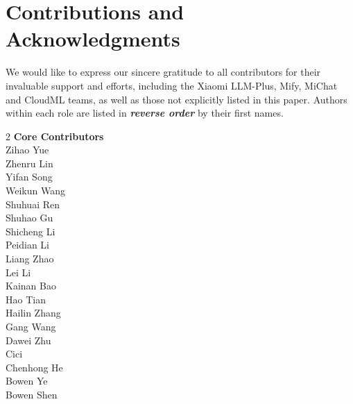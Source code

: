 
\section{Contributions and Acknowledgments}
We would like to express our sincere gratitude to all contributors for their invaluable support and efforts, including the Xiaomi LLM-Plus, Mify, MiChat and CloudML teams, as well as those not explicitly listed in this paper.
Authors within each role are listed in \textit{\textbf{reverse order}} by their first names. 


\begin{multicols}{2} %
\noindent
\textbf{\color{ourred} Core Contributors} \\
\color{ourred} Zihao Yue \\
\color{ourred} Zhenru Lin \\
\color{ourred} Yifan Song \\
\color{ourred} Weikun Wang \\
\color{ourred} Shuhuai Ren \\
\color{ourred} Shuhao Gu \\
\color{ourred} Shicheng Li \\
\color{ourred} Peidian Li \\
\color{ourred} Liang Zhao \\
\color{ourred} Lei Li \\
\color{ourred} Kainan Bao \\
\color{ourred} Hao Tian \\
\color{ourred} Hailin Zhang \\
\color{ourred} Gang Wang \\
\color{ourred} Dawei Zhu \\
\color{ourred} Cici \\
\color{ourred} Chenhong He \\
\color{ourred} Bowen Ye \\
\color{ourred} Bowen Shen \\


\end{multicols}
